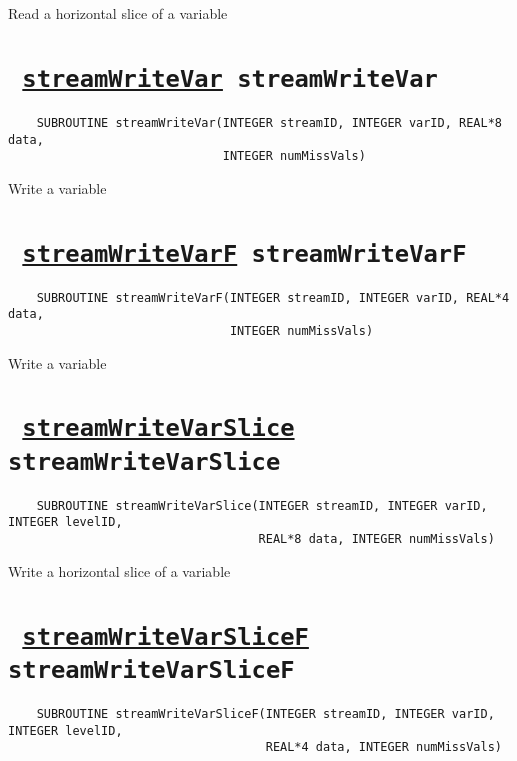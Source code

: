 Read a horizontal slice of a variable
\ifpdfoutput{}{(\ref{streamReadVarSliceF})}


\section*{\texttt{ 
\ifpdf
\hyperref[streamWriteVar]{streamWriteVar}
\else
streamWriteVar
\fi
}}
\begin{verbatim}
    SUBROUTINE streamWriteVar(INTEGER streamID, INTEGER varID, REAL*8 data, 
                              INTEGER numMissVals)
\end{verbatim}

Write a variable
\ifpdfoutput{}{(\ref{streamWriteVar})}


\section*{\texttt{ 
\ifpdf
\hyperref[streamWriteVarF]{streamWriteVarF}
\else
streamWriteVarF
\fi
}}
\begin{verbatim}
    SUBROUTINE streamWriteVarF(INTEGER streamID, INTEGER varID, REAL*4 data, 
                               INTEGER numMissVals)
\end{verbatim}

Write a variable
\ifpdfoutput{}{(\ref{streamWriteVarF})}


\section*{\texttt{ 
\ifpdf
\hyperref[streamWriteVarSlice]{streamWriteVarSlice}
\else
streamWriteVarSlice
\fi
}}
\begin{verbatim}
    SUBROUTINE streamWriteVarSlice(INTEGER streamID, INTEGER varID, INTEGER levelID, 
                                   REAL*8 data, INTEGER numMissVals)
\end{verbatim}

Write a horizontal slice of a variable
\ifpdfoutput{}{(\ref{streamWriteVarSlice})}


\section*{\texttt{ 
\ifpdf
\hyperref[streamWriteVarSliceF]{streamWriteVarSliceF}
\else
streamWriteVarSliceF
\fi
}}
\begin{verbatim}
    SUBROUTINE streamWriteVarSliceF(INTEGER streamID, INTEGER varID, INTEGER levelID, 
                                    REAL*4 data, INTEGER numMissVals)
\end{verbatim}

